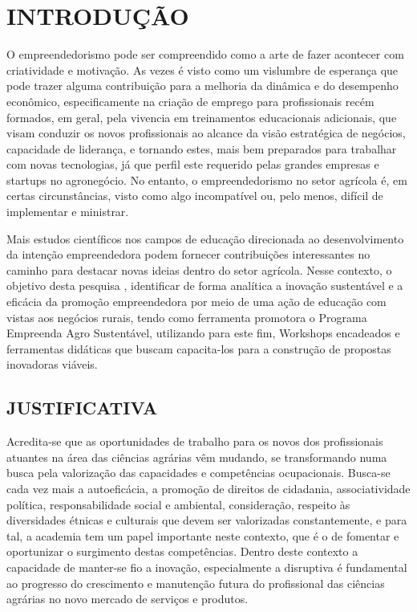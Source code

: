 \chapter{INTRODUÇÃO}

O empreendedorismo  pode ser compreendido como a arte de fazer acontecer com criatividade e motivação. As vezes é visto como um vislumbre de esperança que pode trazer alguma contribuição para a melhoria da dinâmica e do desempenho econômico, especificamente na criação de emprego para profissionais recém formados, em geral, pela vivencia em treinamentos educacionais adicionais, que visam conduzir os novos profissionais ao alcance da visão estratégica de negócios, capacidade de liderança, e tornando estes, mais bem preparados para trabalhar com novas tecnologias, já que  perfil este requerido pelas grandes empresas e startups no agronegócio. No entanto, o empreendedorismo no setor agrícola é, em certas circunstâncias, visto como algo incompatível ou, pelo menos, difícil de implementar e ministrar.

Mais estudos científicos nos campos de educação direcionada ao desenvolvimento da intenção empreendedora  podem fornecer contribuições interessantes no caminho para destacar novas ideias dentro do setor agrícola. Nesse contexto, o  objetivo desta pesquisa , identificar de forma analítica a inovação sustentável e a eficácia da promoção empreendedora por meio de uma ação de educação com vistas aos negócios rurais, tendo como ferramenta promotora o Programa Empreenda Agro Sustentável, utilizando para este fim, Workshops encadeados e ferramentas didáticas que buscam capacita-los para a construção de propostas inovadoras viáveis.



\section{JUSTIFICATIVA}

Acredita-se que as oportunidades de trabalho para os novos dos profissionais atuantes na área das ciências agrárias vêm mudando, se transformando numa busca pela valorização das capacidades e competências ocupacionais. Busca-se cada vez mais a autoeficácia, a promoção de direitos de cidadania, associatividade política, responsabilidade social e ambiental, consideração, respeito às diversidades étnicas e culturais que devem ser valorizadas constantemente, e para tal, a academia tem um papel importante neste contexto, que é o de fomentar e oportunizar o surgimento destas competências. Dentro deste contexto a capacidade de manter-se fio a inovação, especialmente a disruptiva é fundamental ao progresso do crescimento e manutenção futura do profissional das ciências agrárias no novo mercado de serviços e produtos. 

